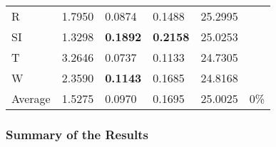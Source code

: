 \documentclass[11pt, a4paper]{article}
\begin{document}
\begin{table}[H]
\begin{tabular}{llllll}
R                                & 1.7950                            & 0.0874                            & 0.1488                               & 25.2995                                     &                                   \\
SI                        & 1.3298                            & \textbf{0.1892}                   & \textbf{0.2158}                      & 25.0253                                     &                                   \\
T                              & 3.2646                            & 0.0737                            & 0.1133                               & 24.7305                                     &                                   \\
W                             & 2.3590                            & \textbf{0.1143}                   & 0.1685                               & 24.8168                                     &                                   \\ \hline
Average                               & 1.5275                            & 0.0970                            & 0.1695                               & 25.0025                                     & 0\%
\end{tabular}
\end{table}

\subsubsection{Summary of the Results}\label{apd:summary}
\end{document}

